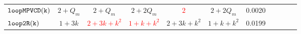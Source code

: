 {\begin {table}[t]
\begin{center}
{\begin{tabular}{ | >{\tiny}l | c | c | c | c | c | c | c | c | c  |c}
          $ {\mathtt{loopMPVCD(k)}}$ &  ${2 + Q_m}$  &  $2 + Q_m$  & $2+2Q_m$  & \textcolor{red}{$2$} & $2+2Q_m$ & 0.0020 \\
          {$\mathtt{loop2R(k)}$} &  $1+3k$ &  \textcolor{red}{$2 + 3k + k^2$} &  \textcolor{red}{$1 + k + k^2$}  &  $2 + 3k + k^2$ &  $1 + k + k^2$ & 0.0199 \\ %

\end{tabular}}
\end{center}
\end{table}}
